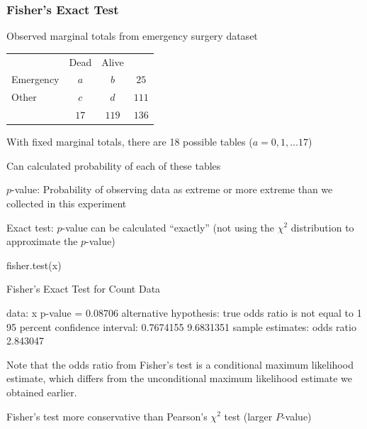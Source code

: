 \subsubsection{Fisher's Exact Test}

Observed marginal totals from emergency surgery dataset \\
\begin{tabular}{l|c|c|c} 
\multicolumn{1}{l}{} & \multicolumn{1}{c}{Dead} & \multicolumn{1}{l}{Alive} \\ \cline{2-3}
Emergency & $a$ & $b$ & $25$ \\ \cline{2-3}
Other & $c$ & $d$ &  $111$ \\ \cline{2-3}
\multicolumn{1}{l}{} & \multicolumn{1}{c}{$17$} & \multicolumn{1}{c}{$119$} & \multicolumn{1}{c}{$136$}
\end{tabular}

\bi
\item With fixed marginal totals, there are 18 possible tables ($a = 0, 1, \ldots 17$)
\item Can calculated probability of each of these tables
\bi
\item $p$-value: Probability of observing data as extreme or more extreme than we collected in this experiment
\ei
\item Exact test: $p$-value can be calculated ``exactly'' (not using the $\chi^2$ distribution to approximate the $p$-value)
\\
\begin{Schunk}
\begin{Sinput}
fisher.test(x)
\end{Sinput}
\begin{Soutput}

	Fisher's Exact Test for Count Data

data:  x
p-value = 0.08706
alternative hypothesis: true odds ratio is not equal to 1
95 percent confidence interval:
 0.7674155 9.6831351
sample estimates:
odds ratio 
  2.843047 
\end{Soutput}
\end{Schunk}
Note that the odds ratio from Fisher's test is a conditional maximum
likelihood estimate, which differs from the unconditional maximum
likelihood estimate we obtained earlier.
\item Fisher's test more conservative than Pearson's $\chi^2$ test
  (larger $P$-value) 
\ei

